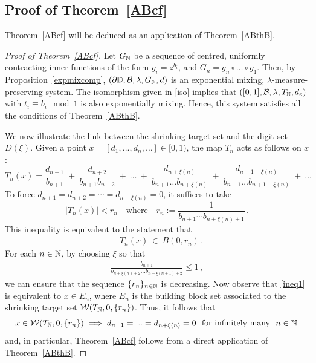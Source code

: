 \documentclass[11pt,reqno]{amsart}
\newcommand{\N}{{\Bbb N}}
\newcommand{\D}{{\Bbb D}}
\newcommand{\0}{\mathbf{0}}
\theoremstyle{remark}
\numberwithin{equation}{section}
\theoremstyle{remark}
\numberwithin{equation}{section}
\newcommand{\red}[1]{\textcolor[rgb]{1.00,0.00,0.00}{#1}}
\begin{document}
\subsection{Proof of Theorem~\ref{ABcf}} \label{apply}
 Theorem~\ref{ABcf} will be deduced as an application of Theorem~\ref{ABthB}.
\begin{proof} [Proof of Theorem~\ref{ABcf}]
Let $G_\N$  be a sequence of centred, uniformly contracting inner functions of the form $g_i=z^{b_i}$, and $G_n=g_n \circ\dots\circ g_1 $. Then, by Proposition~\ref{expmixcomp}, $(\partial \D, \mathcal{B}, \lambda, G_{\N}, d)$ is an exponential mixing, $\lambda$-measure-preserving  system. The isomorphism given in \eqref{iso} implies that $([0,1], \mathcal{B},\lambda, T_{\N}, d_e)$ with $t_i\equiv b_i \mod 1$ is also exponentially mixing. Hence, this system satisfies all the conditions of Theorem~\ref{ABthB}.
   
We now illustrate the link between the shrinking target set and the digit set $D(\xi)$. Given a point $x=[d_1,\dots,d_n,\dots] \in [0,1)$, the map $T_n$ acts as follows on $x$:
$$T_n(x) = \frac{d_{n+1}}{b_{n+1}} \ + \ \frac{d_{n+2}}{b_{n+1}b_{n+2}} \ + \ \dots \ + \ \frac{d_{n+\xi(n)}}{b_{n+1}\dots b_{n+\xi(n)}} \ + \ \frac{d_{n+1+\xi(n)}}{b_{n+1}\dots b_{n+1+\xi(n)}} \ + \ \dots \, $$ 
To force $ d_{n+1} = d_{n+2} = \cdots = d_{n+\xi(n)}=0$, it suffices to take 
$$
|T_n(x)| < r_n \quad \text{where} \quad   r_n:= \frac{ 1 }{ b_{n+1} \cdots b_{n+\xi(n)+1} } \, .$$ This inequality is equivalent to the statement that \begin{eqnarray}\label{ineq1}\quad  T_n(x) \  \in  \ B\left(0, r_n\right) \, .
\end{eqnarray} 
For each $n \in \N$, by choosing $\xi$ so that
\begin{eqnarray}\label{cond1}
    \frac{b_{n+1}}{b_{n+\xi(n)+2}\dots b_{n+\xi(n+1)+2}}\leq 1 \, ,
\end{eqnarray} 
 we can ensure that the sequence $\{r_n\}_{n \in \N}$ is decreasing.
Now observe that \eqref{ineq1} is equivalent to $x \in E_n$, where $E_n$ is the building block set associated to the shrinking target set $\mathcal{W}(T_\N,0,\{r_n\})$.
Thus, it follows that $$x \in \mathcal{W}(T_\N,0,\{r_n\}) \implies d_{n+1}=...=d_{n+\xi(n)}=0 \text{ \ for infinitely many \ } n \in \N \, $$ and, in particular, Theorem~\ref{ABcf} follows from a direct application of Theorem~\ref{ABthB}.
\end{proof}
\end{document}
